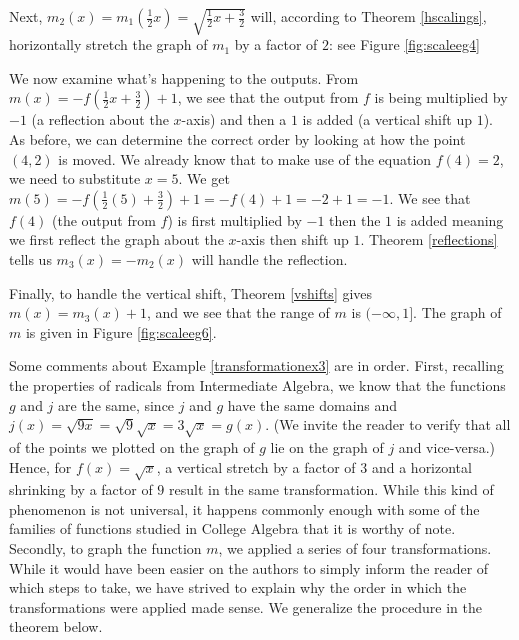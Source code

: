 {\begin{enumerate}
Next, $m_{2}(x) = m_{1}\left(\frac{1}{2} x\right) = \sqrt{\frac{1}{2} x + \frac{3}{2}}$ will, according to Theorem \ref{hscalings}, horizontally stretch the graph of $m_{1}$ by a factor of $2$: see Figure \ref{fig:scaleeg4}


We now examine what's happening to the outputs.  From $m(x) = - f\left(\frac{1}{2} x + \frac{3}{2}\right) + 1$, we see that the output from $f$ is being multiplied by $-1$ (a reflection about the $x$-axis) and then a $1$ is added (a vertical shift up $1$).  As before, we can determine the correct order by looking at how the point $(4,2)$ is moved. We already know that to make use of the equation $f(4)=2$,  we need to substitute $x=5$.  We get  $m(5) = - f\left(\frac{1}{2} (5) + \frac{3}{2}\right) + 1= - f(4)+1 = -2+1 = -1$.  We see that $f(4)$ (the output from $f$) is first multiplied by $-1$ then the $1$ is added meaning we first reflect the graph about the $x$-axis then shift up $1$.  Theorem \ref{reflections} tells us $m_{3}(x) = - m_{2}(x)$ will handle the reflection.


Finally, to handle the vertical shift, Theorem \ref{vshifts} gives $m(x) = m_{3}(x) +1$, and we see that the range of $m$ is $(-\infty,1]$. The graph of $m$ is given in Figure \ref{fig:scaleeg6}.


\end{enumerate}
}

\bigskip

Some comments about Example \ref{transformationex3} are in order.  First, recalling the properties of radicals from Intermediate Algebra, we know that the functions $g$ and $j$ are the same, since $j$ and $g$ have the same domains and $j(x) = \sqrt{9x} = \sqrt{9} \sqrt{x} = 3 \sqrt{x} = g(x)$. (We invite the reader to verify that all of the points we plotted on the graph of $g$ lie on the graph of $j$ and vice-versa.)  Hence, for  $f(x) = \sqrt{x}$, a vertical stretch by a factor of $3$ and a horizontal shrinking by a factor of $9$ result in the same transformation.  While this kind of phenomenon is not universal, it happens commonly enough with some of the families of functions studied in College Algebra that it is worthy of note.  Secondly, to graph the function $m$, we applied a series of four transformations.  While it would have been easier on the authors to simply inform the reader of which steps to take, we have strived to explain why the order in which the transformations were applied made sense.  We generalize the procedure in the theorem below.

